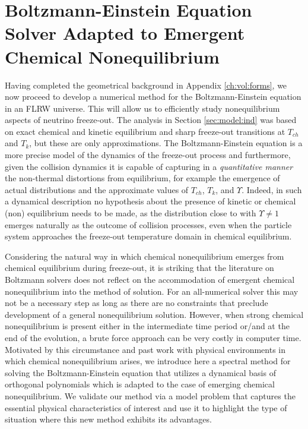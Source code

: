 \section{Boltzmann-Einstein Equation Solver Adapted to Emergent Chemical Nonequilibrium}\label{ch:boltz:orthopoly}

Having completed the geometrical background in Appendix \ref{ch:vol:forms}, we now proceed to develop a numerical method for the Boltzmann-Einstein equation in an FLRW universe.  This will allow us to efficiently study  nonequilibrium aspects of neutrino freeze-out. The analysis in Section \ref{sec:model:ind} was based on exact chemical and kinetic equilibrium and sharp freeze-out transitions at $T_{ch}$ and $T_k$, but these are  only approximations.  The  Boltzmann-Einstein equation is a more precise model of the dynamics of the freeze-out process and furthermore, given the collision dynamics it is capable of capturing in a {\em quantitative manner} the non-thermal distortions from equilibrium, for example the emergence of actual distributions and the approximate values  of $T_{ch}$, $T_k$, and $\Upsilon$.  Indeed,  in  such a dynamical description no hypothesis about the presence of kinetic or chemical (non) equilibrium needs to be made, as the distribution close to  with   $\Upsilon\ne  1$ emerges naturally as the outcome of collision processes, even when the particle system approaches the freeze-out temperature domain  in chemical equilibrium.

Considering the natural way in which chemical nonequilibrium emerges from chemical equilibrium during freeze-out, it is striking that the literature on Boltzmann solvers does not reflect on the accommodation of emergent chemical nonequilibrium into the method of solution. For an all-numerical solver this may not be a necessary step as long as there are no constraints that preclude development of a general nonequilibrium solution. However, when strong chemical nonequilibrium is present either in the intermediate time period or/and at the end of the evolution, a brute force approach can be very costly in computer time. Motivated by this circumstance and past work with physical environments in which chemical nonequilibrium arises,  we introduce here a  spectral method for solving the Boltzmann-Einstein equation that utilizes a dynamical basis of orthogonal polynomials which is adapted to the case of emerging chemical nonequilibrium. We validate our method via a  model problem  that captures the essential physical characteristics of interest and use it to highlight the type of situation where this new method exhibits its advantages.

